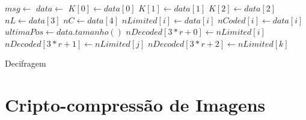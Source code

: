 \begin{algorithm}[t]
\begin{algorithmic}[1]
\footnotesize
    \vspace{0.2em}
    \State $msg \gets$ 
    \vspace{0.5em}
    \State $data \gets$ 
    \vspace{0.5em}
    \State $K[0] \gets data[0]$
    \State $K[1] \gets data[1]$
    \State $K[2] \gets data[2]$
    \vspace{0.5em}
    \State $nL \gets data[3]$
    \vspace{0.5em}
    \State $nC \gets data[4]$
    \vspace{0.5em}
        \vspace{0.2em}
        \State $nLimited[i] \gets data[i]$
    \EndFor
    \vspace{0.5em}
        \vspace{0.2em}
        \State $nCoded[i] \gets data[i]$
    \EndFor
    \vspace{0.5em}
    \State $ultimaPos \gets data.tamanho()$
        \vspace{0.2em}
            \vspace{0.2em}
                \vspace{0.2em}
                    \vspace{0.2em}
                        \vspace{0.2em}
                        \State $nDecoded[3*r+0] \gets nLimited[i]$
                        \State $nDecoded[3*r+1] \gets nLimited[j]$
                        \State $nDecoded[3*r+2] \gets nLimited[k]$
                    \EndIf
                \EndFor
            \EndFor
        \EndFor
    \EndFor
    \vspace{0.5em}
    \State {}
\end{algorithmic}
\caption{Decifragem}
\label{algorithm: gmprd}
\end{algorithm}

\section{Cripto-compressão de Imagens}

